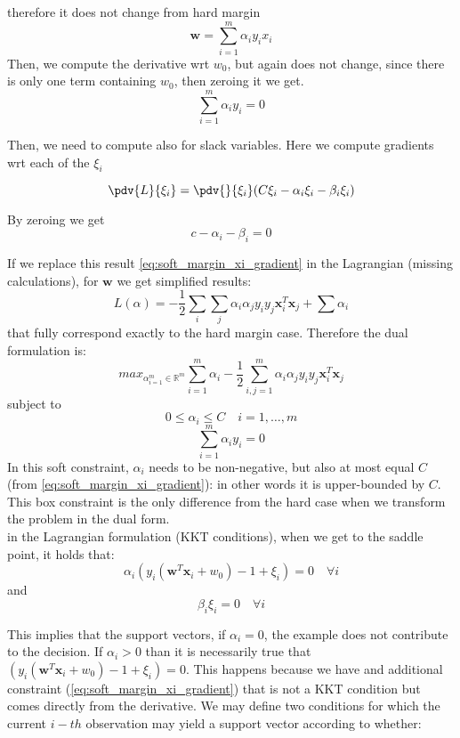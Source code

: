 therefore it does not change from hard margin
\begin{equation}
	\pmb{w}= \sum_{i=1}^{m}\alpha_{i}y_{i}x_{i}\label{eq:soft_margin_w_result}
\end{equation}
Then, we compute the derivative wrt $w_{0}$, but again does not change, since
there is only one term containing $w_{0}$, then zeroing it we get.
\begin{equation}
	\sum_{i=1}^{m}\alpha_{i}y_{i}= 0 \label{eq:soft_margin_w_0_result}
\end{equation}

Then, we need to compute also for slack variables. Here we compute gradients wrt
each of the $\xi_{i}$

\[
	\pdv{L}{\xi_i}= \pdv{}{\xi_i}(C\xi_{i}- \alpha_{i}\xi_{i}- \beta_{i}\xi_{i})
\]

By zeroing we get
\begin{equation}
	c - \alpha_{i}- \beta_{i}= 0 \label{eq:soft_margin_xi_gradient}
\end{equation}

If we replace this result \ref{eq:soft_margin_xi_gradient} in the Lagrangian (missing
calculations), for $\pmb{w}$ we get simplified results:
\[
	L(\alpha) = -\frac{1}{2}\sum_{i}\sum_{j}\alpha_{i}\alpha_{j}y_{i}y_{j}\pmb{x}_{i}
	^{T}\pmb{x}_{j}+ \sum \alpha_{i}
\]
that fully correspond exactly to the hard margin case. Therefore the dual formulation
is:
\begin{equation}
	max_{\alpha_{i=1}^m \in \mathbb{R}^m}\sum_{i=1}^{m}\alpha_{i}- \frac{1}{2}\sum_{i,
	j = 1}^{m}\alpha_{i}\alpha_{j}y_{i}y_{j}\pmb{x}_{i}^{T}\pmb{x}_{j}\label{eq:dual_formulation_object_soft}
\end{equation}
subject to
\[
	0 \leq \alpha_{i}\leq C \quad i = 1, \dots, m
\]
\[
	\sum_{i=1}^{m}\alpha_{i}y_{i}= 0
\]
In this soft constraint, $\alpha_{i}$ needs to be non-negative, but also at most
equal $C$ (from \ref{eq:soft_margin_xi_gradient}): in other words it is upper-bounded by $C$.
This box constraint is the only
difference from the hard case when we transform the problem in the dual form.\\

in the Lagrangian formulation (KKT conditions), when we get to the saddle point, it holds that:
\[
	\alpha_{i}(y_{i}(\pmb{w}^{T}\pmb{x}_{i}+ w_{0}) - 1 + \xi_{i}) = 0 \quad \forall
	i
\]
and
\[
	\beta_{i}\xi_{i}= 0 \quad \forall i
\]


This implies that the support vectors, if $\alpha_{i}= 0$, the example does not
contribute to the decision. If $\alpha_{i}> 0$ than it is necessarily true that $(
y_{i}(\pmb{w}^{T}\pmb{x}_{i}+ w_{0}) - 1 + \xi_{i}) = 0$. This happens because
we have and additional constraint (\ref{eq:soft_margin_xi_gradient}) that is not
a KKT condition but comes directly from the derivative.
We may define two conditions for which the current $i-th$ observation 
may yield a support vector according to whether:


